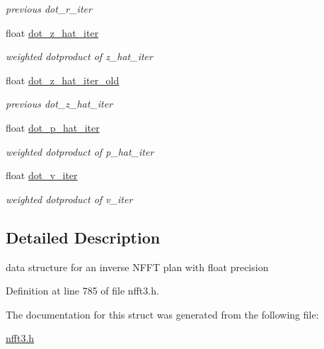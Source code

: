 \begin{DoxyCompactItemize}
\begin{DoxyCompactList}\small\item\em previous dot\-\_\-r\-\_\-iter \end{DoxyCompactList}\item 
\hypertarget{structsolverf__plan__double_a845482517a34f22d7eb39bf1747e5dd6}{float \hyperlink{structsolverf__plan__double_a845482517a34f22d7eb39bf1747e5dd6}{dot\-\_\-z\-\_\-hat\-\_\-iter}}\label{structsolverf__plan__double_a845482517a34f22d7eb39bf1747e5dd6}

\begin{DoxyCompactList}\small\item\em weighted dotproduct of z\-\_\-hat\-\_\-iter \end{DoxyCompactList}\item 
\hypertarget{structsolverf__plan__double_aa9672016211508805091ab645b489bbf}{float \hyperlink{structsolverf__plan__double_aa9672016211508805091ab645b489bbf}{dot\-\_\-z\-\_\-hat\-\_\-iter\-\_\-old}}\label{structsolverf__plan__double_aa9672016211508805091ab645b489bbf}

\begin{DoxyCompactList}\small\item\em previous dot\-\_\-z\-\_\-hat\-\_\-iter \end{DoxyCompactList}\item 
\hypertarget{structsolverf__plan__double_a2bf2a21b09e47a883f9665b4ec38f3c2}{float \hyperlink{structsolverf__plan__double_a2bf2a21b09e47a883f9665b4ec38f3c2}{dot\-\_\-p\-\_\-hat\-\_\-iter}}\label{structsolverf__plan__double_a2bf2a21b09e47a883f9665b4ec38f3c2}

\begin{DoxyCompactList}\small\item\em weighted dotproduct of p\-\_\-hat\-\_\-iter \end{DoxyCompactList}\item 
\hypertarget{structsolverf__plan__double_aaeae6a2f28ba0ded31baca1aa8c36431}{float \hyperlink{structsolverf__plan__double_aaeae6a2f28ba0ded31baca1aa8c36431}{dot\-\_\-v\-\_\-iter}}\label{structsolverf__plan__double_aaeae6a2f28ba0ded31baca1aa8c36431}

\begin{DoxyCompactList}\small\item\em weighted dotproduct of v\-\_\-iter \end{DoxyCompactList}\end{DoxyCompactItemize}


\subsection{Detailed Description}
data structure for an inverse N\-F\-F\-T plan with float precision 

Definition at line 785 of file nfft3.\-h.



The documentation for this struct was generated from the following file\-:\begin{DoxyCompactItemize}
\item 
\hyperlink{nfft3_8h}{nfft3.\-h}\end{DoxyCompactItemize}
